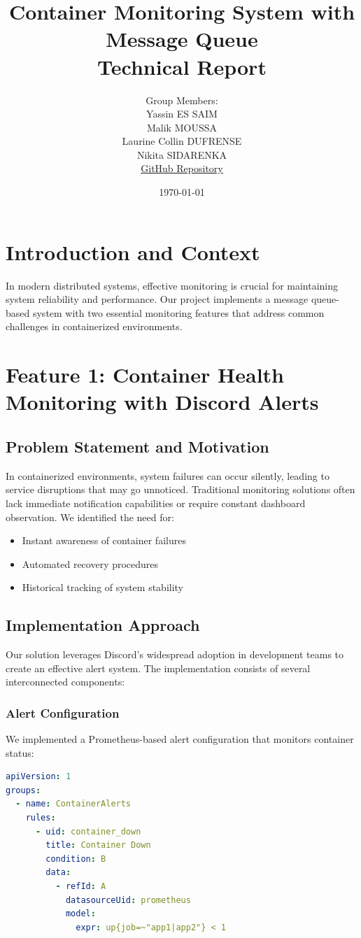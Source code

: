 \documentclass[12pt,a4paper]{article}
\title{Container Monitoring System with Message Queue\\Technical Report}
\author{
    Group Members:\\
    Yassin ES SAIM\\
    Malik MOUSSA\\
    Laurine Collin DUFRENSE\\
    Nikita SIDARENKA
    \\
    \href{https://github.com/laurinecd/SoftwareArchiPRoject.git}{GitHub Repository}
}
\date{\today}
\begin{document}
\maketitle

\section{Introduction and Context}

In modern distributed systems, effective monitoring is crucial for maintaining system reliability and performance. Our project implements a message queue-based system with two essential monitoring features that address common challenges in containerized environments.

\section{Feature 1: Container Health Monitoring with Discord Alerts}

\subsection{Problem Statement and Motivation}
In containerized environments, system failures can occur silently, leading to service disruptions that may go unnoticed. Traditional monitoring solutions often lack immediate notification capabilities or require constant dashboard observation. We identified the need for:
\begin{itemize}
    \item Instant awareness of container failures
    \item Automated recovery procedures
    \item Historical tracking of system stability
\end{itemize}

\subsection{Implementation Approach}
Our solution leverages Discord's widespread adoption in development teams to create an effective alert system. The implementation consists of several interconnected components:

\subsubsection{Alert Configuration}
We implemented a Prometheus-based alert configuration that monitors container status:
\begin{lstlisting}[language=yaml]
apiVersion: 1
groups:
  - name: ContainerAlerts
    rules:
      - uid: container_down
        title: Container Down
        condition: B
        data:
          - refId: A
            datasourceUid: prometheus
            model:
              expr: up{job=~"app1|app2"} < 1
\end{lstlisting}
\end{document}
